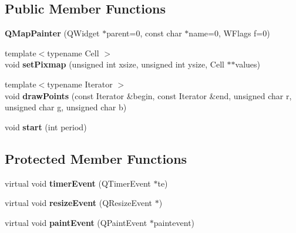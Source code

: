 \subsection*{Public Member Functions}
\begin{DoxyCompactItemize}
\item 
\mbox{\label{classQMapPainter_ad02329677ea39c064f9791d312cdec34}} 
{\bfseries Q\+Map\+Painter} (Q\+Widget $\ast$parent=0, const char $\ast$name=0, W\+Flags f=0)
\item 
\mbox{\label{classQMapPainter_a5473ffe4d3cfbf012396d6c112790045}} 
{\footnotesize template$<$typename Cell $>$ }\\void {\bfseries set\+Pixmap} (unsigned int xsize, unsigned int ysize, Cell $\ast$$\ast$values)
\item 
\mbox{\label{classQMapPainter_ae6a5a71b7c3a080a3facd665eabbaea8}} 
{\footnotesize template$<$typename Iterator $>$ }\\void {\bfseries draw\+Points} (const Iterator \&begin, const Iterator \&end, unsigned char r, unsigned char g, unsigned char b)
\item 
\mbox{\label{classQMapPainter_a94b767c466b6169817d5e29ee6b2ea3b}} 
void {\bfseries start} (int period)
\end{DoxyCompactItemize}
\subsection*{Protected Member Functions}
\begin{DoxyCompactItemize}
\item 
\mbox{\label{classQMapPainter_a431755606bb7827249d33c4ebaabacb2}} 
virtual void {\bfseries timer\+Event} (Q\+Timer\+Event $\ast$te)
\item 
\mbox{\label{classQMapPainter_ab775705f92dc8b127a79093755b638b6}} 
virtual void {\bfseries resize\+Event} (Q\+Resize\+Event $\ast$)
\item 
\mbox{\label{classQMapPainter_a37958ec02d1a8bfde3a88bc210b7e202}} 
virtual void {\bfseries paint\+Event} (Q\+Paint\+Event $\ast$paintevent)
\end{DoxyCompactItemize}
